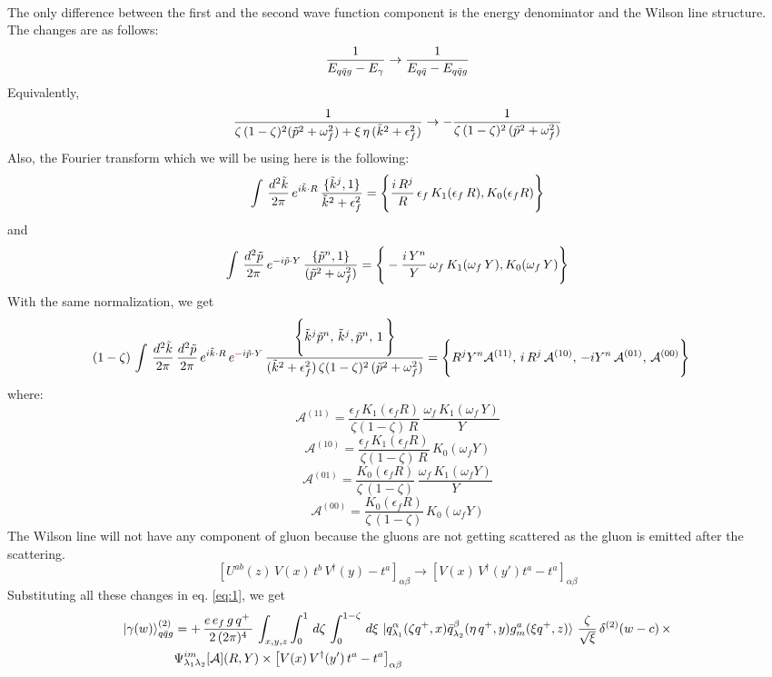 \documentclass[9pt]{article}
\newif\ifmarked \markedtrue
\newcommand{\chg}[1]{\ifmarked{\color{red}#1}\else{#1}\fi}
\numberwithin{equation}{section}
\begin{document}
\begin{enumerate}
\begin{align}
\label{chg:dena}\end{align}
The only difference between the first and the second wave function component is the energy denominator and the Wilson line structure. The changes are as follows:
$$\frac{1}{E_{q\Bar{q}g}-E_{\gamma}}\rightarrow \frac{1}{E_{q\Bar{q}}-E_{q\Bar{q}g}}$$ 
Equivalently,
$$\frac{1}{\zeta\,(1-\zeta)^{2}(\Tilde{p}^{2}+\omega^{2}_{f})+\xi\,\eta\, (\Tilde{k}^{2}+\epsilon_{f}^{2})}\rightarrow -\frac{1}{\zeta\,(1-\zeta)^{2}\,(\Tilde{p}^{2}+\omega^{2}_{f})}$$
Also, the Fourier transform which we will be using here is the following:
$$\int\, \frac{d^{2}\Tilde{k}}{2\pi}\, e^{i\Tilde{k}\cdot R}\, \frac{\{\Tilde{k}^{j},1\}}{\Tilde{k}^{2}+\epsilon^{2}_{f}} = \Bigg\{\frac{i\,R^{j}}{R}\,\epsilon_{f}\,K_{1}(\epsilon_{f}\,R),K_{0}(\epsilon_{f} R)\Bigg\}$$
and $$\int\, \frac{d^{2}\Tilde{p}}{2\pi}\, e^{-i\Tilde{p}\cdot Y}\,\frac{\{\Tilde{p}^{n},1\}}{(\Tilde{p}^{2}+\omega^{2}_{f})} = \Bigg\{-\frac{i\,Y^{n}}{Y}\,\omega_{f}\,K_{1}(\omega_{f}\,Y),K_{0}(\omega_{f}\,Y)\Bigg\} $$
With the same normalization, we get
\begin{align}
    (1-\zeta)\, \int\, \frac{d^{2}\Tilde{k}}{2\pi}\, \frac{d^{2}\Tilde{p}}{2\pi}\, e^{i\Tilde{k}\cdot R}\,e^{\chg{-}i\Tilde{p}\cdot Y}\, \frac{\Bigg\{\Tilde{k}^{j}\Tilde{p}^{n},\,\Tilde{k}^{j},\Tilde{p}^{n},\,1\,\Bigg\}}{(\Tilde{k}^{2}+\epsilon^{2}_{f})\,\zeta(1-\zeta)^{2}\,(\Tilde{p}^{2} +\omega^{2}_{f})} & = \Bigg\{R^{j}Y^{n}\mathcal{A}^{(11)},\, i\,R^{j}\,\mathcal{A}^{(10)},\, -iY^{n}\,\mathcal{A}^{(01)},\, \mathcal{A}^{(00)}\Bigg\}
\label{chg:pFT2}\end{align}
where: 
$$\mathcal{A}^{(11)} = \frac{\epsilon_{f}\,K_{1}(\epsilon_{f} R)}{\zeta(1-\zeta)\,R}\,\frac{\omega_{f}\,K_{1}(\omega_{f}\,Y)}{Y}$$
$$\mathcal{A}^{(10)} = \frac{\epsilon_{f}\,K_{1}(\epsilon_{f}R)}{\zeta(1-\zeta)\,R}\, K_{0}(\omega_{f}Y)$$
$$\mathcal{A}^{(01)} = \frac{K_{0}(\epsilon_{f}R)}{\zeta\,(1-\zeta)}\,\frac{\omega_{f}\,K_{1}(\omega_{f}Y)}{Y}$$
$$\mathcal{A}^{(00)} = \frac{K_{0}(\epsilon_{f}R)}{\zeta\,(1-\zeta)}\,K_{0}(\omega_{f}Y)$$
The Wilson line will not have any component of gluon because the gluons are not getting scattered as the gluon is emitted after the scattering. 
$$\left[U^{ab}(z)\,V(x)\,t^{b}\,V^{\dagger}(y)-t^{a}\right]_{\alpha\beta}\rightarrow \left[V(x)\,V^{\dagger}(y')t^{a}-t^{a}\right]_{\alpha\beta} $$
Substituting all these changes in eq. \eqref{eq:1}, we get
\begin{align} \label{eq:2}
     \ket{\gamma(w)}^{(2)}_{q\Bar{q}g} & = +\,\frac{e\,e_{f}\,g\,q^{+}\,}{2\,(2\pi)^{4}}\, \int_{x,y,z} \int_{0}^{1}\, d\zeta\, \int_{0}^{1-\zeta}\, d\xi\,\ket{q^{\alpha}_{\lambda_{1}}(\zeta q^{+},x)\Bar{q}^{\beta}_{\lambda_{2}}(\eta\,q^{+},y)g^{a}_{m}(\xi q^{+},z)}\, \frac{\zeta}{\sqrt{\xi}}\, \delta^{(2)}(w-c)\,\times \notag \\ & \Psi^{im}_{\lambda_{1}\lambda_{2}}[\mathcal{A}](R,Y)\times \left[V(x)\,V^{\dagger}(y')\,t^{a}-t^{a}\right]_{\alpha\beta}

\end{align}
\end{enumerate}
\end{document}
